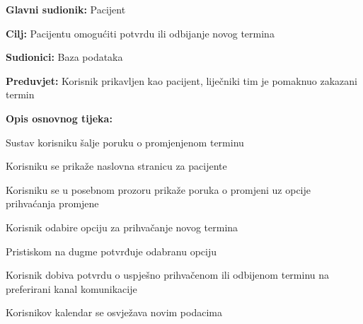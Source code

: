 					
					
					\noindent {}
					\begin{packed_item}
	
						\item \textbf{Glavni sudionik: }Pacijent
						\item  \textbf{Cilj:} Pacijentu omogućiti potvrdu ili odbijanje novog termina
						\item  \textbf{Sudionici:} Baza podataka
						\item  \textbf{Preduvjet:} Korisnik prikavljen kao pacijent, liječniki tim je pomaknuo zakazani termin
						\item  \textbf{Opis osnovnog tijeka:}
						
						\item[] \begin{packed_enum}
	                        
	                        \item Sustav korisniku šalje poruku o promjenjenom terminu
							\item Korisniku se prikaže naslovna stranicu za pacijente
							\item Korisniku se u posebnom prozoru prikaže poruka o promjeni uz opcije prihvaćanja promjene
							\item Korisnik odabire opciju za prihvačanje novog termina
							\item Pristiskom na dugme potvrđuje odabranu opciju
							\item Korisnik dobiva potvrdu o uspješno prihvačenom ili odbijenom terminu na preferirani kanal komunikacije
							\item Korisnikov kalendar se osvježava novim podacima
						\end{packed_enum}
						
					
					\end{packed_item}
					
